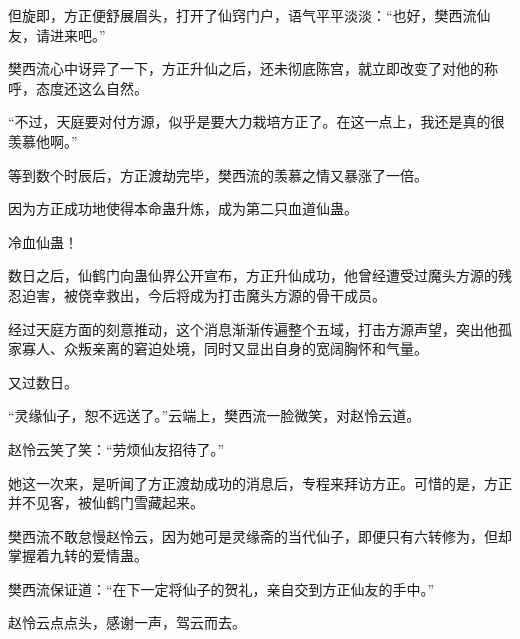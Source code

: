 \begin{this_body}
但旋即，方正便舒展眉头，打开了仙窍门户，语气平平淡淡：“也好，樊西流仙友，请进来吧。”

樊西流心中讶异了一下，方正升仙之后，还未彻底陈宫，就立即改变了对他的称呼，态度还这么自然。

“不过，天庭要对付方源，似乎是要大力栽培方正了。在这一点上，我还是真的很羡慕他啊。”

等到数个时辰后，方正渡劫完毕，樊西流的羡慕之情又暴涨了一倍。

因为方正成功地使得本命蛊升炼，成为第二只血道仙蛊。

冷血仙蛊！

数日之后，仙鹤门向蛊仙界公开宣布，方正升仙成功，他曾经遭受过魔头方源的残忍迫害，被侥幸救出，今后将成为打击魔头方源的骨干成员。

经过天庭方面的刻意推动，这个消息渐渐传遍整个五域，打击方源声望，突出他孤家寡人、众叛亲离的窘迫处境，同时又显出自身的宽阔胸怀和气量。

又过数日。

“灵缘仙子，恕不远送了。”云端上，樊西流一脸微笑，对赵怜云道。

赵怜云笑了笑：“劳烦仙友招待了。”

她这一次来，是听闻了方正渡劫成功的消息后，专程来拜访方正。可惜的是，方正并不见客，被仙鹤门雪藏起来。

樊西流不敢怠慢赵怜云，因为她可是灵缘斋的当代仙子，即便只有六转修为，但却掌握着九转的爱情蛊。

樊西流保证道：“在下一定将仙子的贺礼，亲自交到方正仙友的手中。”

赵怜云点点头，感谢一声，驾云而去。

\end{this_body}

